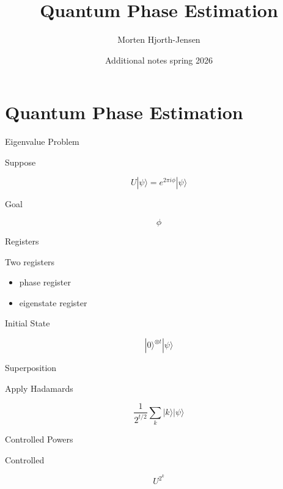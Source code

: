 \documentclass{beamer}
\title{Quantum Phase Estimation}
\author{Morten Hjorth-Jensen}
\date{Additional notes spring 2026}
\begin{document}
\frame{\titlepage}

\section{Quantum Phase Estimation}

\begin{frame}{Eigenvalue Problem}

Suppose

\[
U|\psi\rangle=e^{2\pi i\phi}|\psi\rangle
\]

Goal

\[
\phi
\]

\end{frame}


\begin{frame}{Registers}

Two registers

\begin{itemize}
\item phase register
\item eigenstate register
\end{itemize}

\end{frame}


\begin{frame}{Initial State}

\[
|0\rangle^{\otimes t}|\psi\rangle
\]

\end{frame}


\begin{frame}{Superposition}

Apply Hadamards

\[
\frac{1}{2^{t/2}}
\sum_k |k\rangle |\psi\rangle
\]

\end{frame}


\begin{frame}{Controlled Powers}

Controlled

\[
U^{2^k}
\]

\end{frame}

\end{document}
